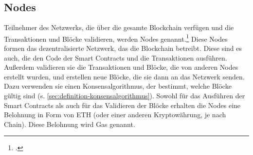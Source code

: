 \subsection{Nodes}
\label{sec:definition-nodes}
Teilnehmer des Netzwerks, die über die gesamte Blockchain verfügen und die Transaktionen und Blöcke validieren, werden Nodes genannt.\footcites[Vgl. hierzu und zum Folgenden][]{w12}[]{w13} 
Diese Nodes formen das dezentralisierte Netzwerk, das die Blockchain betreibt.
Diese sind es auch, die den Code der Smart Contracts und die Transaktionen ausführen.
Außerdem validieren sie die Transaktionen und Blöcke, die von anderen Nodes erstellt wurden, und erstellen neue Blöcke, die sie dann an das Netzwerk senden.
Dazu verwenden sie einen Konsensalgorithmus, der bestimmt, welche Blöcke gültig sind (s. \ref{sec:definition-konsensalgorithmus}). 
Sowohl für das Ausführen der Smart Contracts als auch für das Validieren der Blöcke erhalten die Nodes eine Belohnung in Form von ETH (oder einer anderen Kryptowährung, je nach Chain). 
Diese Belohnung wird Gas genannt.